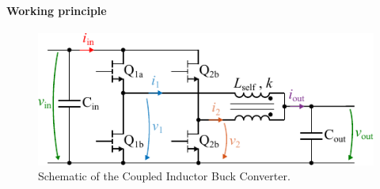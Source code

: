 \documentclass{IPEC2026}
\begin{document}
\paragraph{Working principle}
\begin{figure} [b]
  \centering
  \includegraphics[width=0.9\columnwidth]{figures/Inkscape/Schematic.pdf}
  \caption{Schematic of the Coupled Inductor Buck Converter.}
  \label{fig:Schematic_BuckConfig_Coupled}
\end{figure}
\end{document}
